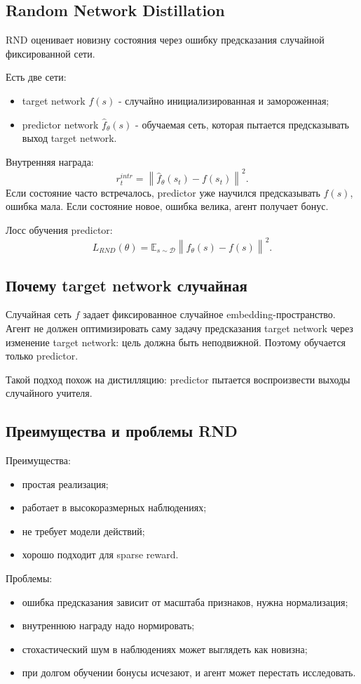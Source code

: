 \documentclass[11pt,a4paper]{article}
\newcommand{\E}{\mathbb{E}}
\newcommand{\1}{\mathbf{1}}
\newcommand{\cD}{\mathcal D}
\begin{document}
\subsection*{Random Network Distillation}
RND оценивает новизну состояния через ошибку предсказания случайной фиксированной сети.

Есть две сети:
\begin{itemize}
    \item target network $f(s)$ - случайно инициализированная и замороженная;
    \item predictor network $\hat f_\theta(s)$ - обучаемая сеть, которая пытается предсказывать выход target network.
\end{itemize}

Внутренняя награда:
\[
    r_t^{intr}=\left\|\hat f_\theta(s_t)-f(s_t)\right\|^2.
\]
Если состояние часто встречалось, predictor уже научился предсказывать $f(s)$, ошибка мала. Если состояние новое, ошибка велика, агент получает бонус.

Лосс обучения predictor:
\[
    L_{RND}(\theta)=\E_{s\sim\cD}\left\|\hat f_\theta(s)-f(s)\right\|^2.
\]

\subsection*{Почему target network случайная}
Случайная сеть $f$ задает фиксированное случайное embedding-пространство. Агент не должен оптимизировать саму задачу предсказания target network через изменение target network: цель должна быть неподвижной. Поэтому обучается только predictor.

Такой подход похож на дистилляцию: predictor пытается воспроизвести выходы случайного учителя.

\subsection*{Преимущества и проблемы RND}
Преимущества:
\begin{itemize}
    \item простая реализация;
    \item работает в высокоразмерных наблюдениях;
    \item не требует модели действий;
    \item хорошо подходит для sparse reward.
\end{itemize}

Проблемы:
\begin{itemize}
    \item ошибка предсказания зависит от масштаба признаков, нужна нормализация;
    \item внутреннюю награду надо нормировать;
    \item стохастический шум в наблюдениях может выглядеть как новизна;
    \item при долгом обучении бонусы исчезают, и агент может перестать исследовать.
\end{itemize}
\end{document}
